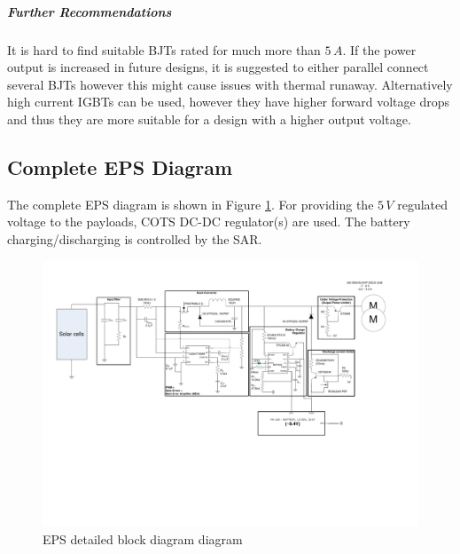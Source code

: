 \subparagraph*{Further Recommendations}
%
It is hard to find suitable \acp{BJT} rated for much more than $5\,A$. If the power output is increased in future designs, it is suggested to either parallel connect several \acp{BJT} however this might cause issues with thermal runaway. Alternatively high current \acp{IGBT} can be used, however they have higher forward voltage drops and thus they are more suitable for a design with a higher output voltage.


%
\subsection{Complete EPS Diagram}
%
The complete \ac{EPS} diagram is shown in Figure \ref{fig:EPS_diagram_detailed}. For providing the $5\,V$ regulated voltage to the payloads, \ac{COTS} DC-DC regulator(s) are used. The battery charging/discharging is controlled by the \ac{SAR}.
%
\begin{figure}
\centering
\includegraphics[scale=0.8]{figures/fig_CDR_EPSdiagram_detailed}
\caption{\ac{EPS} detailed block diagram diagram}
\label{fig:EPS_diagram_detailed}
\end{figure}

%
